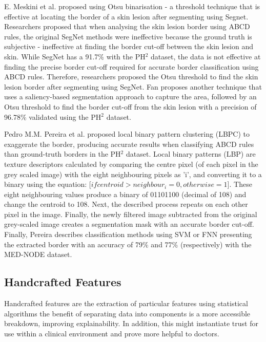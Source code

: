 E. Meskini et al. proposed using Otsu binarisation - a threshold technique that is effective at locating the border of a skin lesion after segmenting using Segnet\cite{Meskini2018}. Researchers proposed that when analysing the skin lesion border using ABCD rules, the original SegNet methods were ineffective because the ground truth is subjective - ineffective at finding the border cut-off between the skin lesion and skin. While SegNet has a 91.7\% with the PH$^2$ dataset, the data is not effective at finding the precise border cut-off required for accurate border classification using ABCD rules. Therefore, researchers proposed the Otsu threshold to find the skin lesion border after segmenting using SegNet. Fan proposes another technique that uses a saliency-based segmentation approach to capture the area, followed by an Otsu threshold\cite{Fan2017} to find the border cut-off from the skin lesion with a precision of 96.78\% validated using the PH$^2$ dataset.

Pedro M.M. Pereira et al. proposed local binary pattern clustering (LBPC) to exaggerate the border, producing accurate results when classifying ABCD rules than ground-truth borders in the PH$^2$ dataset\cite{Pereira2020}. Local binary patterns (LBP) are texture descriptors calculated by comparing the centre pixel (of each pixel in the grey scaled image) with the eight neighbouring pixels as 'i', and converting it to a binary using the equation:  [$if centroid > neighbour_i =  0, otherwise = 1$]. These eight neighbouring values produce a binary of 01101100 (decimal of 108) and change the centroid to 108. Next, the described process repeats on each other pixel in the image. Finally, the newly filtered image subtracted from the original grey-scaled image creates a segmentation mask with an accurate border cut-off. Finally, Pereira describes classification methods using SVM or FNN presenting the extracted border with an accuracy of 79\% and 77\% (respectively) with the MED-NODE dataset.

\subsection{Handcrafted Features}
Handcrafted features are the extraction of particular features using statistical algorithms the benefit of separating data into components is a more accessible breakdown, improving explainability. In addition, this might instantiate trust for use within a clinical environment and prove more helpful to doctors.

